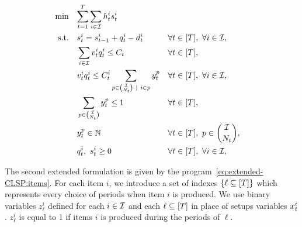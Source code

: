 \begin{subequations}\label{eq:extended-CLSP:periods}
  \begin{align}
    \min\quad & \rlap{$\ds \sum_{t=1}^{\horizon} \sum_{i\in\REF} \holding_t^i \inventory_t^i$}
    \label{eq:extended-CLSP:periods:objective}
    \\
    \st\quad & \ds \inventory_t^i = \inventory_{t-1}^i + \quantity_t^i - \demand_t^i && \forall t\in\range{\horizon},\ \forall i\in\REF,
    \label{eq:extended-CLSP:periods:inventory-dynamic}
    \\
    & \ds \sum_{i\in\REF} \rate_t^i \quantity_t^i \le \capacity_t && \forall t\in\range{\horizon},
    \label{eq:extended-CLSP:periods:capacity}
    \\
    & \ds \rate_t^i \quantity_t^i \le \capacity_t^i \sum_{p\in{\REF\choose\nbsetups_t}~|~i\in p} y_t^p && \forall t\in\range{\horizon},\ \forall i\in\REF,
    \label{eq:extended-CLSP:periods:item-capacity}
    \\
    & \ds \sum_{p\in{\REF\choose\nbsetups_t}} y_t^p \le 1 && \forall t\in\range{\horizon},
    \label{eq:extended-CLSP:periods:unique-pattern}
    \\
    & \ds y_t^p \in \NN && \forall t\in\range{\horizon},\ p\in{\REF\choose\nbsetups_t},
    \label{eq:extended-CLSP:periods:pattern-def}
    \\
    & \ds \quantity_t^i,\ \inventory_t^i \ge 0 && \forall t\in\range{\horizon},\ \forall i\in\REF,
    \label{eq:extended-CLSP:periods:positivity}
  \end{align}
\end{subequations}


The second extended formulation is given by the program~\eqref{eq:extended-CLSP:items}. For each item $i$, we introduce a set of indexes $\crbracket{\ell\subseteq\range{\horizon}}$ which represents every choice of periods when item $i$ is produced. We use binary variables $z_{\ell}^i$ defined for each $i\in\mathcal{I}$ and each $\ell\subseteq\range{\horizon}$ in place of setups variables $x_t^i$. $z_{\ell}^i$ is equal to 1 if items $i$ is produced during the periods of $\ell$.

